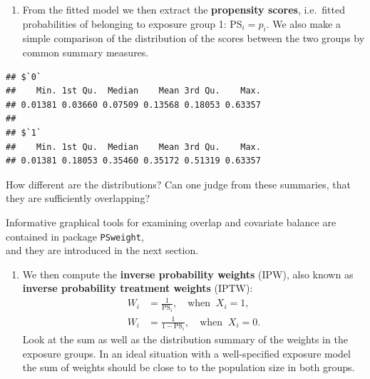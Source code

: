 \documentclass[
]{book}
\newenvironment{Shaded}{\begin{snugshade}}{\end{snugshade}}
\newcommand{\AttributeTok}[1]{\textcolor[rgb]{0.13,0.29,0.53}{#1}}
\newcommand{\FunctionTok}[1]{\textcolor[rgb]{0.13,0.29,0.53}{\textbf{#1}}}
\newcommand{\NormalTok}[1]{#1}
\newcommand{\OtherTok}[1]{\textcolor[rgb]{0.56,0.35,0.01}{#1}}
\newcommand{\SpecialCharTok}[1]{\textcolor[rgb]{0.81,0.36,0.00}{\textbf{#1}}}
\newcommand{\StringTok}[1]{\textcolor[rgb]{0.31,0.60,0.02}{#1}}
\providecommand{\tightlist}{%
  \setlength{\itemsep}{0pt}\setlength{\parskip}{0pt}}
\theoremstyle{definition}
\theoremstyle{definition}
\theoremstyle{definition}
\theoremstyle{definition}
\theoremstyle{remark}
\begin{document}
\begin{enumerate}
\def\labelenumi{\arabic{enumi}.}
\setcounter{enumi}{1}
\tightlist
\item
  From the fitted model we then extract the \textbf{propensity scores},
  i.e.~fitted probabilities of belonging to exposure group 1:
  \(\text{PS}_i = \widehat{p_i}\). We also make a simple comparison of
  the distribution of the scores between the two groups by common
  summary measures.
\end{enumerate}

\begin{Shaded}
\end{Shaded}

\begin{verbatim}
## $`0`
##    Min. 1st Qu.  Median    Mean 3rd Qu.    Max. 
## 0.01381 0.03660 0.07509 0.13568 0.18053 0.63357 
## 
## $`1`
##    Min. 1st Qu.  Median    Mean 3rd Qu.    Max. 
## 0.01381 0.18053 0.35460 0.35172 0.51319 0.63357
\end{verbatim}

How different are the distributions? Can one judge from these summaries,
that they are sufficiently overlapping?

Informative graphical tools for examining overlap and covariate balance
are contained in package \texttt{PSweight},\\
and they are introduced in the next section.

\begin{enumerate}
\def\labelenumi{\arabic{enumi}.}
\setcounter{enumi}{2}
\tightlist
\item
  We then compute the \textbf{inverse probability weights} (IPW), also
  known as \textbf{inverse probability treatment weights} (IPTW):
  \[\begin{aligned}
   W_i & = \frac{1}{\text{PS}_i}, \quad \text{when }\ X_i=1, \\
   W_i & = \frac{1}{1-\text{PS}_i}, \quad \text{when }\ X_i=0 . 
  \end{aligned} \] Look at the sum as well as the distribution summary
  of the weights in the exposure groups. In an ideal situation with a
  well-specified exposure model the sum of weights should be close to
  to the population size in both groups.
\end{enumerate}
\end{document}
